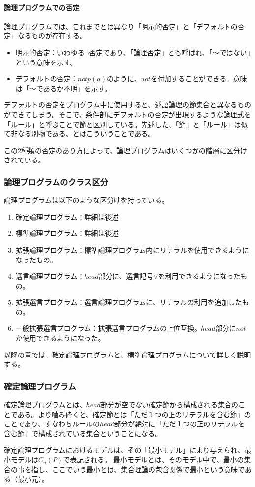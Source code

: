 \documentclass[dvipdfmx]{jsarticle}
\begin{document}
\paragraph{論理プログラムでの否定}
論理プログラムでは、これまでとは異なり「明示的否定」と「デフォルトの否定」なるものが存在する。
\begin{itemize}
  \item 明示的否定：いわゆる$\neg$否定であり、「論理否定」とも呼ばれ、「〜ではない」という意味を示す。
  \item デフォルトの否定：$not p(a)$のように、$not$を付加することができる。意味は「〜であるか不明」を示す。
\end{itemize}
デフォルトの否定をプログラム中に使用すると、述語論理の節集合と異なるものができてしまう。そこで、条件部にデフォルトの否定が出現するような論理式を「ルール」と呼ぶことで節と区別している。先述した、「節」と「ルール」は似て非なる別物である、とはこういうことである。\par
この2種類の否定のあり方によって、論理プログラムはいくつかの階層に区分けされている。
  \subsubsection{論理プログラムのクラス区分}
  論理プログラムは以下のような区分けを持っている。
  \begin{enumerate}
    \item 確定論理プログラム：詳細は後述
    \item 標準論理プログラム：詳細は後述
    \item 拡張論理プログラム：標準論理プログラム内にリテラルを使用できるようになったもの。
    \item 選言論理プログラム：$head$部分に、選言記号$\vee$を利用できるようになったもの。
    \item 拡張選言プログラム：選言論理プログラムに、リテラルの利用を追加したもの。
    \item 一般拡張選言プログラム：拡張選言プログラムの上位互換。$head$部分に$not$が使用できるようになった。
  \end{enumerate}
  以降の章では、確定論理プログラムと、標準論理プログラムについて詳しく説明する。
  \subsubsection{確定論理プログラム}
  確定論理プログラムとは、$head$部分が空でない確定節から構成される集合のことである。より噛み砕くと、確定節とは「ただ１つの正のリテラルを含む節」のことであり、すなわちルールの$head$部分が絶対に「ただ１つの正のリテラルを含む節」で構成されている集合ということになる。\par
  確定論理プログラムにおけるモデルは、その「最小モデル」により与えられ、最小モデルは$C_{n}(P)$で表記される。
  最小モデルとは、そのモデル中で、最小の集合の事を指し、ここでいう最小とは、集合理論の包含関係で最小という意味である（最小元）。\par
\end{document}
